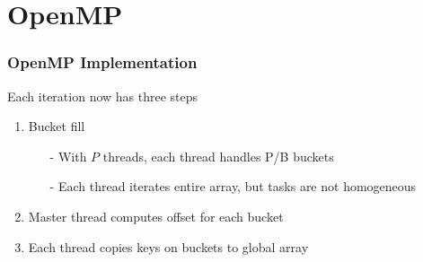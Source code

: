 \section{OpenMP}

\begin{frame}
	\frametitle{OpenMP Implementation}

	Each iteration now has three steps

\begin{enumerate}\itemsep=15pt
		\item Bucket fill
		\begin{itemize}
			\item[-] With $P$ threads, each thread handles P/B buckets
			\item[-] Each thread iterates entire array, but tasks are not homogeneous
		\end{itemize}

		\item Master thread computes offset for each bucket

		\item Each thread copies keys on buckets to global array
	\end{enumerate}
\end{frame}
